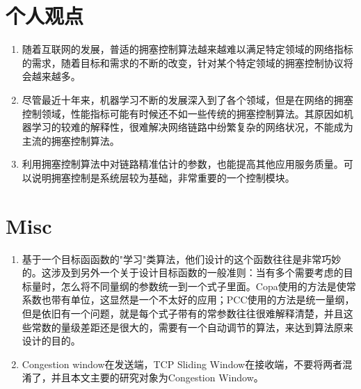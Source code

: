 \documentclass[a4paper, 12pt, UTF8]{ctexart}
\begin{document}
\section{个人观点}
\begin{enumerate}
	\item 随着互联网的发展，普适的拥塞控制算法越来越难以满足特定领域的网络指标的需求，随着目标和需求的不断的改变，针对某个特定领域的拥塞控制协议将会越来越多。
	\item 尽管最近十年来，机器学习不断的发展深入到了各个领域，但是在网络的拥塞控制领域，性能指标可能有时候还不如一些传统的拥塞控制算法。其原因如机器学习的较难的解释性，很难解决网络链路中纷繁复杂的网络状况，不能成为主流的拥塞控制算法。
	\item 利用拥塞控制算法中对链路精准估计的参数，也能提高其他应用服务质量。可以说明拥塞控制是系统层较为基础，非常重要的一个控制模块。
\end{enumerate}


\clearpage

\section{Misc}

\begin{enumerate}
	\item 基于一个目标函函数的"学习"类算法，他们设计的这个函数往往是非常巧妙的。这涉及到另外一个关于设计目标函数的一般准则：当有多个需要考虑的目标量时，怎么将不同量纲的参数统一到一个式子里面。Copa使用的方法是使常系数也带有单位，这显然是一个不太好的应用；PCC使用的方法是统一量纲，但是依旧有一个问题，就是每个式子带有的常参数往往很难解释清楚，并且这些常数的量级差距还是很大的，需要有一个自动调节的算法，来达到算法原来设计的目的。
	\item Congestion window在发送端，TCP Sliding Window在接收端，不要将两者混淆了，并且本文主要的研究对象为Congestion Window。
\end{enumerate}

\clearpage


\end{document}
